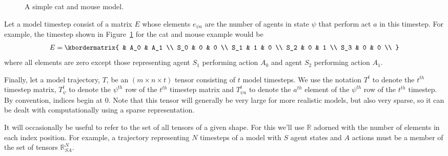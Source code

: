 \documentclass{article}
\begin{document}
\begin{figure}
	\centering
	\caption{A simple cat and mouse model.\label{fig:AB-MCMC-1}}
\end{figure}


Let a model timestep consist of a matrix $E$ whose elements $e_{\psi a}$ are the number of agents in state $\psi$ that perform act $a$ in this timestep. For example, the timestep shown in Figure~\ref{fig:AB-MCMC-1} for the cat and mouse example would be
\[
E = \kbordermatrix{
	& A_0 & A_1 \\
	S_0 & 0 & 0 \\
	S_1 & 1 & 0 \\
	S_2 & 0  & 1 \\
	S_3 & 0 & 0 \\
}
\]
where all elements are zero except those representing agent $S_1$ performing action $A_0$ and agent $S_2$ performing action $A_1$.

Finally, let a model trajectory, $T$, be an $(m\times n\times t)$ tensor consisting of $t$ model timesteps. We use the notation $T^t$ to denote the $t^{th}$ timestep matrix, $T^t_\psi$ to denote the $\psi^{th}$ row of the $t^{th}$ timestep matrix and $T^t_{\psi a}$ to denote the $a^{th}$ element of the $\psi^{th}$ row of the $t^{th}$ timestep. By convention, indices begin at 0. Note that this tensor will generally be very large for more realistic models, but also very sparse, so it can be dealt with computationally using a sparse representation.

It will occasionally be useful to refer to the set of all tensors of a given shape. For this we'll use $\mathbb{R}$ adorned with the number of elements in each index position. For example, a trajectory representing $N$ timesteps of a model with $S$ agent states and $A$ actions must be a member of the set of tensors $\mathbb{R}^N_{SA}$.
\end{document}
